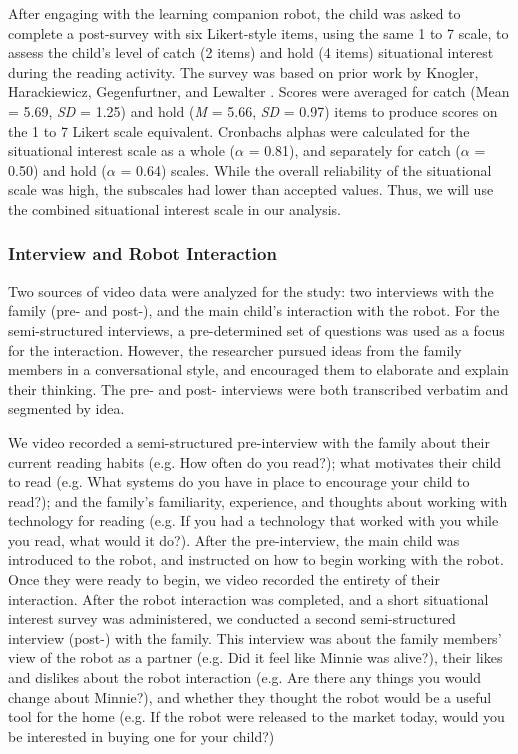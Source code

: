 \documentclass{sigchi}
\begin{document}
  After engaging with the learning companion robot, the child was asked to complete a post-survey with six Likert-style items, using the same 1 to 7 scale, to assess the child's level of catch (2 items) and hold (4 items) situational interest during the reading activity. The survey was based on prior work by Knogler, Harackiewicz, Gegenfurtner, and Lewalter \cite{Knogler:2015}. Scores were averaged for catch (Mean = 5.69, \textit{SD} = 1.25) and hold (\textit{M} = 5.66, \textit{SD} = 0.97) items to produce scores on the 1 to 7 Likert scale equivalent. Cronbachs alphas were calculated for the situational interest scale as a whole ($\alpha$ = 0.81), and separately for catch ($\alpha$ = 0.50) and hold ($\alpha$ = 0.64) scales. While the overall reliability of the situational scale was high, the subscales had lower than accepted values. Thus, we will use the combined situational interest scale in our analysis.
  
\subsubsection{Interview and Robot Interaction}
  Two sources of video data were analyzed for the study: two interviews with the family (pre- and post-), and the main child's interaction with the robot. For the semi-structured interviews, a pre-determined set of questions was used as a focus for the interaction. However, the researcher pursued ideas from the family members in a conversational style, and encouraged them to elaborate and explain their thinking. The pre- and post- interviews were both transcribed verbatim and segmented by idea\cite{Chi:1997}.
 
  We video recorded a semi-structured pre-interview with the family about their current reading habits (e.g. How often do you read?); what motivates their child to read (e.g. What systems do you have in place to encourage your child to read?); and the family's familiarity, experience, and thoughts about working with technology for reading (e.g. If you had a technology that worked with you while you read, what would it do?). After the pre-interview, the main child was introduced to the robot, and instructed on how to begin working with the robot. Once they were ready to begin, we video recorded the entirety of their interaction. After the robot interaction was completed, and a short situational interest survey was administered, we conducted a second semi-structured interview (post-) with the family. This interview was about the family members' view of the robot as a partner (e.g. Did it feel like Minnie was alive?), their likes and dislikes about the robot interaction (e.g. Are there any things you would change about Minnie?), and whether they thought the robot would be a useful tool for the home (e.g. If the robot were released to the market today, would you be interested in buying one for your child?)
  
\end{document}
